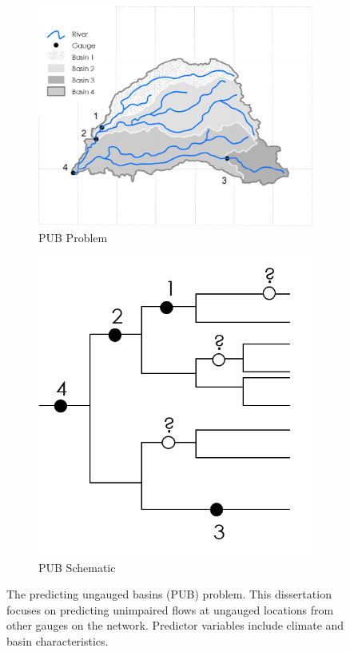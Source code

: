 \begin{figure}
	\centering
	\begin{subfigure}{.5\textwidth}
		\centering
		\includegraphics[width=\linewidth]{plots/ch1_pub_problem.png}
		\caption{PUB Problem}
		\label{fig:sub2}
	\end{subfigure}%
	\begin{subfigure}{.5\textwidth}
		\centering
		\includegraphics[width=0.74\linewidth]{plots/ch1_pub_schematic.png}
		\caption{PUB Schematic}
		\label{fig:sub1}
	\end{subfigure}
	\caption{The predicting ungauged basins (PUB) problem. This dissertation focuses on predicting unimpaired flows at ungauged locations from other gauges on the network. Predictor variables include climate and basin characteristics.}
	\label{fig:pubproblem}
\end{figure}

